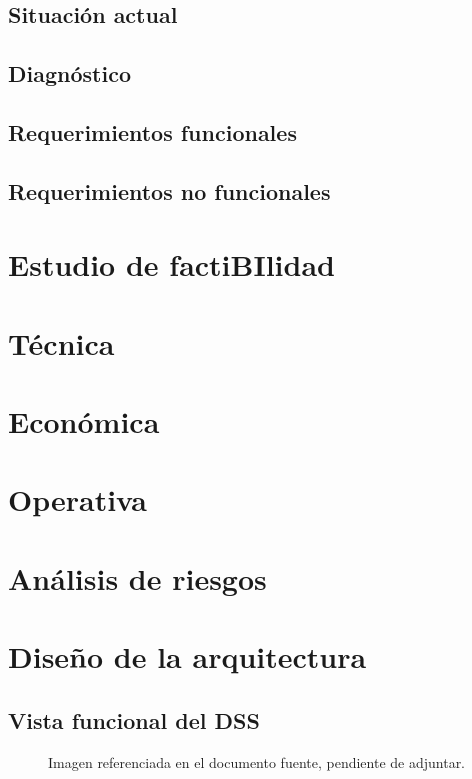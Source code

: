 \documentclass[11pt,oneside,openany]{book}
\begin{document}
\subsection{Situación actual}

\subsection{Diagnóstico}

\subsection{Requerimientos funcionales}

\subsection{Requerimientos no funcionales}

\section{Estudio de factiBIlidad}

\section{Técnica}

\section{Económica}

\section{Operativa}

\section{Análisis de riesgos}

\section{Diseño de la arquitectura}

\subsection{Vista funcional del DSS}

\begin{figure}[htbp]\centering
{}
\caption*{Imagen referenciada en el documento fuente, pendiente de adjuntar.}
\end{figure}
\end{document}
